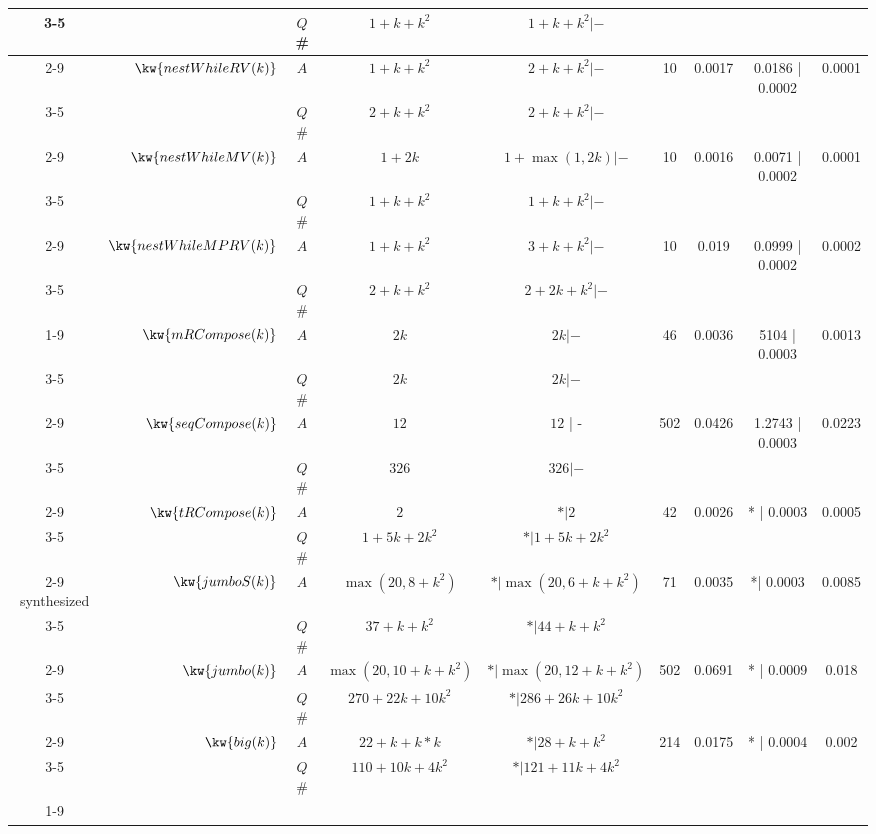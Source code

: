 \begin {table}[H]
\begin{center}
{\begin{tabular}{ >{\tiny}c| r | >{\tiny}c | c | c | c | c | c | c  }
         \cline{3-5}
         & & $Q$ \#   & $1 + k + k^2$ & $1 + k + k^2|- $ & & & & \\
         \cline{2-9}
         & $\kw{nestWhileRV(k)}$ 
         & $A$ & $1 + k + k^2$ &  $ 2 + k +  k^2 | -$   &  10 & 0.0017 & 0.0186 | 0.0002 & 0.0001  \\
         \cline{3-5}
         & & $Q$ \#   & {$2 + k + k^2$} &  $2 + k + k^2| -$ & & & & \\
         \cline{2-9}
         & $\kw{nestWhileMV(k)}$ 
         & $A$ & $1 + 2k $ & $1 + \max(1,2k) | -$  & 10 & 0.0016 & 0.0071 | 0.0002 & 0.0001 \\
         \cline{3-5}
         & & $Q$ \#   & {$1 + k + k^2$} &  $1 + k + k^2 |-$  & & & & \\
         \cline{2-9}
         & \multirow{2}{*}{$\kw{nestWhileMPRV(k)}$}
         & $A$  &  $1 + k + k^2$ &  $3 + k + k^2| -$  &  10 & 0.019 & 0.0999 | 0.0002 & 0.0002 \\
         \cline{3-5}
         & & $Q$ \#   & $2 + k + k^2 $ & $2 + 2k + k^2 | - $  & & & & \\
         \cline{1-9}
         & $\kw{mRCompose(k)}$ 
         & $A$ & $2k$ & $  2k | -$   &  46 & 0.0036 & 5104 | 0.0003 &  0.0013\\
         \cline{3-5}
         & & $Q$ \#   & {$2k$} & $ 2k | -$   & & & & \\
         \cline{2-9}
         & $\kw{seqCompose(k)}$ 
         & $A$ & $12$ & $12  $ | -  &  502 & 0.0426  & 1.2743 | 0.0003 & 0.0223 \\
         \cline{3-5}
         & & $Q$ \#   & $326$ & $326 | -$   & & & & \\
         \cline{2-9}
         & \multirow{2}{*}{$\kw{tRCompose(k)}$} 
         & $A$ & $2$ &  $ * | 2$   &  42 & 0.0026 & * | 0.0003 & 0.0005\\
         \cline{3-5}
         & & $Q$ \#   & $1 + 5k + 2 k^2 $ & $* | 1 + 5k + 2 k^2 $  & & & & \\
         \cline{2-9}
         synthesized
         & \multirow{2}{*}{$\kw{{jumboS(k)}}$}
         & $A$ & $ \max(20, 8+k^2)$ &  {$ * | \max(20, 6+k+k^2)$}    &  71 & 0.0035 & *| 0.0003 &  0.0085 \\
         \cline{3-5}
         & & $Q$ \#   & $37+k+k^2 $ & $* | {44+k+k^2}$  & & & & \\
         \cline{2-9}
         & \multirow{2}{*}{$\kw{jumbo(k)}$}
         & $A$ & $ \max(20, 10+k+k^2 )$    &  $* | \max(20, 12 + k+ k^2)$   &  502 & 0.0691 & * | 0.0009 & 0.018 \\
         \cline{3-5}
         & & $Q$ \#   & $270 + 22k + 10k^2 $ & $* | 286+26k+10k^2$  & & & & \\
         \cline{2-9}
         & \multirow{2}{*}{$\kw{big(k)}$} 
         & $A$ &  $22+k+k*k$  &  $* |28 + k + k^2 $ &  214 & 0.0175 & * | 0.0004 & 0.002 \\
         \cline{3-5}
         & & $Q$ \#   & $110+10k+4k^2$ & $* |121+11k+4k^2 $   & & & & \\
         \cline{1-9}
        \end{tabular}
}
\end{center}
\end{table}